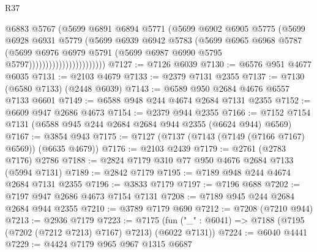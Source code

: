 \begin{lexlean}{R37}
\begin{coremodule}
                                    @6883
                                    @5767
                                    (@5699
                                      @6891
                                      @6894
                                      @5771
                                      (@5699
                                        @6902
                                        @6905
                                        @5775
                                        (@5699
                                          @6928
                                          @6931
                                          @5779
                                          (@5699
                                            @6939
                                            @6942
                                            @5783
                                            (@5699
                                              @6965
                                              @6968
                                              @5787
                                              (@5699
                                                @6976
                                                @6979
                                                @5791
                                                (@5699
                                                  @6987
                                                  @6990
                                                  @5795
                                                  @5797)))))))))))))))))))))))
@7127 := @7126 @6039
@7130 := @6576 @951 @4677 @6035
@7131 := @2103 @4679
@7133 := @2379 @7131 @2355
@7137 := @7130 (@6580 @7133) (@2448 @6039)
@7143 := @6589 @950 @2684 @4676 @6557 @7133 @6601
@7149 := @6588 @948 @244 @4674 @2684 @7131 @2355
@7152 := @6609 @947 @2686 @4673
@7154 := @2379 @944 @2355
@7166 := @7152 @7154 @7131 (@6588 @945 @244 @2684 @2684 @944 @2355 (@6624 @944) @6569)
@7167 := @3854 @943
@7175 := @7127 (@7137 (@7143 (@7149 (@7166 @7167) @6569)) (@6635 @4679))
@7176 := @2103 @2439
@7179 := @2761 (@2783 @7176) @2786
@7188 := @2824 @7179 @310 @77 @950 @4676 @2684 @7133 (@5994 @7131)
@7189 := @2842 @7179
@7195 := @7189 @948 @244 @4674 @2684 @7131 @2355
@7196 := @3833 @7179
@7197 := @7196 @688
@7202 := @7197 @947 @2686 @4673 @7154 @7131
@7208 := @7189 @945 @244 @2684 @2684 @944 @2355
@7210 := @3789 @7179 @690
@7212 := @7208 (@7210 @944)
@7213 := @2936 @7179
@7223 := @7175 (fun ("_" : @6041) => @7188 (@7195 (@7202 (@7212 @7213) @7167) @7213) (@6022 @7131))
@7224 := @6040 @4441
@7229 := @4424 @7179 @965 @967 @1315 @6687

\end{coremodule}
\end{lexlean}
